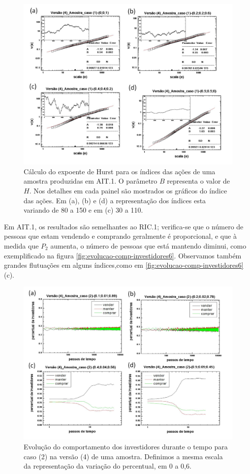 \documentclass[brazil,ruledheader]{abnt}
\begin{document}
\begin{figure}[!h]
\centering
\includegraphics[width=.7\linewidth]{Figuras/27.jpg}
\caption [Cálculo do expoente de Hurst para os índices em AIT.1]{Cálculo do
expoente de Hurst para os índices das ações de uma amostra
produzidas em AIT.1.  O parâmetro $B$ representa o valor de
$H$. Nos detalhes em cada painel são mostrados os gráficos do índice das ações.
Em (a), (b) e (d)  a representação dos índices esta variando de 80 a 150 e em
(c) 30 a 110. }
\end{figure}

Em AIT.1, os resultados são semelhantes ao RIC.1; verifica-se que o número de
pessoas que estam vendendo e comprando
geralmente é proporcional, e que à medida que $P_2$ aumenta, o número de pessoas
que está mantendo diminui, como exemplificado na figura
\ref{fig:evolucao-comp-investidores6}. Observamos também grandes flutuações em
alguns índices,como em \ref{fig:evolucao-comp-investidores6} (c).

\begin{figure}[!h]
\centering
\includegraphics[width=.7\linewidth]{Figuras/28.jpg}
\caption{Evolução do comportamento dos investidores durante o tempo para caso
(2) na  versão (4) de uma amostra. Definimos a mesma escala da representação da
variação do percentual, em 0 a 0,6.  }
\label{fig:evolucao-comp-investidores7}
\end{figure}
\end{document}
